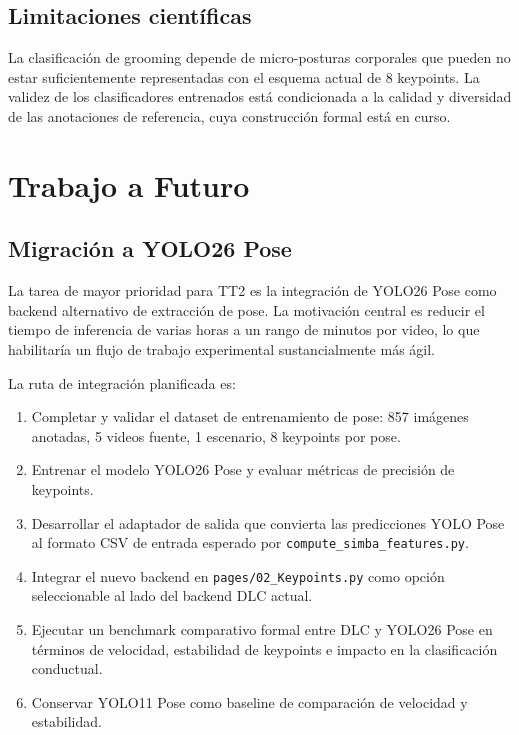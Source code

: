 \documentclass[12pt]{report}
\begin{document}
\section{Limitaciones científicas}

La clasificación de grooming depende de micro-posturas corporales que pueden
no estar suficientemente representadas con el esquema actual de 8 keypoints.
La validez de los clasificadores entrenados está condicionada a la calidad y
diversidad de las anotaciones de referencia, cuya construcción formal está
en curso.

\chapter{Trabajo a Futuro}

\section{Migración a YOLO26 Pose}

La tarea de mayor prioridad para TT2 es la integración de YOLO26 Pose como
backend alternativo de extracción de pose. La motivación central es reducir
el tiempo de inferencia de varias horas a un rango de minutos por video, lo
que habilitaría un flujo de trabajo experimental sustancialmente más ágil.

La ruta de integración planificada es:

\begin{enumerate}[label=\arabic*.]
    \item Completar y validar el dataset de entrenamiento de pose:
          857 imágenes anotadas, 5 videos fuente, 1 escenario, 8 keypoints por pose.
    \item Entrenar el modelo YOLO26 Pose y evaluar métricas de precisión de keypoints.
    \item Desarrollar el adaptador de salida que convierta las predicciones YOLO Pose
          al formato CSV de entrada esperado por \texttt{compute\_simba\_features.py}.
    \item Integrar el nuevo backend en \texttt{pages/02\_Keypoints.py} como opción
          seleccionable al lado del backend DLC actual.
    \item Ejecutar un benchmark comparativo formal entre DLC y YOLO26 Pose en términos
          de velocidad, estabilidad de keypoints e impacto en la clasificación conductual.
    \item Conservar YOLO11 Pose como baseline de comparación de velocidad y estabilidad.
\end{enumerate}
\end{document}
